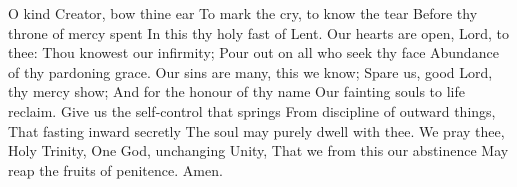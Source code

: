 O kind Creator, bow thine ear
To mark the cry, to know the tear
Before thy throne of mercy spent
In this thy holy fast of Lent.
\vskip 1mm
Our hearts are open, Lord, to thee:
Thou knowest our infirmity;
Pour out on all who seek thy face
Abundance of thy pardoning grace.
\vskip 1mm
Our sins are many, this we know;
Spare us, good Lord, thy mercy show;
And for the honour of thy name
Our fainting souls to life reclaim.
\vskip 1mm
Give us the self-control that springs
From discipline of outward things,
That fasting inward secretly
The soul may purely dwell with thee.
\vskip 1mm
We pray thee, Holy Trinity,
One God, unchanging Unity,
That we from this our abstinence
May reap the fruits of penitence.
Amen.

